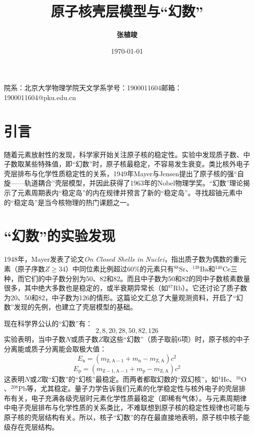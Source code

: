 \documentclass[a4paper,fontset=none]{ctexart}
\begin{document}
    \title{\textbf{原子核壳层模型与“幻数”}}
    \author{\Large\textbf{张植竣}}
    \date{\today}
    \maketitle
    \begin{center}
        院系：北京大学物理学院天文学系\hspace{2em}学号：1900011604\hspace{2em}邮箱：1900011604@pku.edu.cn
    \end{center}

    \section*{引言}

    随着元素放射性的发现，科学家开始关注原子核的稳定性。实验中发现质子数、中子数取某些特殊值，即“幻数”时，原子核最稳定，不容易发生衰变。类比核外电子壳层排布与化学性质稳定性的关系，1949年Mayer与Jensen提出了原子核的强“自旋——轨道耦合”壳层模型，并因此获得了1963年的Nobel物理学奖。“幻数”理论揭示了元素周期表内“稳定岛”的内在规律并预言了新的“稳定岛”。寻找超铀元素中的“稳定岛”是当今核物理的热门课题之一。

    \section*{“幻数”的实验发现}

    1948年，Mayer发表了论文\textit{On Closed Shells in Nuclei}，指出质子数为偶数的重元素（原子序数$Z\geqslant34$）中同位素比例超过60\%的元素只有$\mathrm{^{88}Sr}$、$\mathrm{^{138}Ba}$和$\mathrm{^{140}Ce}$三种，而它们的中子数分别为50、82和82。而且中子数为50和82的同中子数核素数量很多，其中绝大多数也是稳定的，或半衰期异常长（如$\mathrm{^{87}Rb}$）。它还讨论了质子数为20、50和82，中子数为126的情形。这篇论文汇总了大量观测资料，开启了“幻数”发现的先例，也建立了壳层模型的基础。

    现在科学界公认的“幻数”有：
    \[
    2,8,20,28,50,82,126
    \]
    实验表明，当中子数$N$或质子数$Z$取这些“幻数”（质子取前6项）时，原子核的中子分离能或质子分离能会取极大值：
    \[
    E_\mathrm{n} = \left(m_\mathrm{Z,A-1} + m_\mathrm{n} - m_\mathrm{Z,A}\right)c^2
    \]
    \[
    E_\mathrm{p} = \left(m_\mathrm{Z-1,A-1} + m_\mathrm{p} - m_\mathrm{Z,A}\right)c^2
    \]
    这表明$N$或$Z$取“幻数”的“幻核”最稳定。而两者都取幻数的“双幻核”，如$\mathrm{^{4}He}$、$\mathrm{^{16}O}$、$\mathrm{^{208}Pb}$等，尤其稳定。量子力学告诉我们元素的化学稳定性与核外电子的壳层排布有关，电子充满各级壳层时元素化学性质最稳定（即稀有气体）。与元素周期律中电子壳层排布与化学性质的关系类比，不难联想到原子核的稳定性规律也可能与原子核的壳层结构有关。所以，核子“幻数”的存在最直接地表明，原子核中核子能级存在壳层结构。
\end{document}
